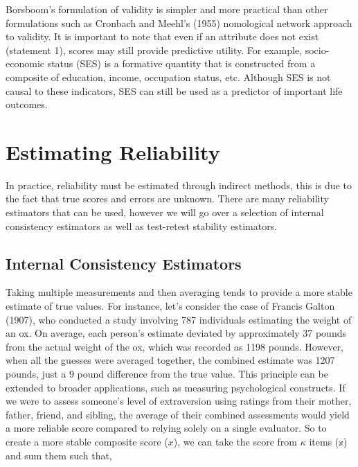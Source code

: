 \documentclass[
  letterpaper,
  DIV=11,
  numbers=noendperiod]{scrreprt}
\begin{document}
Borsboom's formulation of validity is simpler and more practical than
other formulations such as Cronbach and Meehl's (1955) nomological
network approach to validity. It is important to note that even if an
attribute does not exist (statement 1), scores may still provide
predictive utility. For example, socio-economic status (SES) is a
formative quantity that is constructed from a composite of education,
income, occupation status, etc. Although SES is not causal to these
indicators, SES can still be used as a predictor of important life
outcomes.

\hypertarget{estimating-reliability}{%
\section{Estimating Reliability}\label{estimating-reliability}}

In practice, reliability must be estimated through indirect methods,
this is due to the fact that true scores and errors are unknown. There
are many reliability estimators that can be used, however we will go
over a selection of internal consistency estimators as well as
test-retest stability estimators.

\hypertarget{internal-consistency-estimators}{%
\subsection{Internal Consistency
Estimators}\label{internal-consistency-estimators}}

Taking multiple measurements and then averaging tends to provide a more
stable estimate of true values. For instance, let's consider the case of
Francis Galton (1907), who conducted a study involving 787 individuals
estimating the weight of an ox. On average, each person's estimate
deviated by approximately 37 pounds from the actual weight of the ox,
which was recorded as 1198 pounds. However, when all the guesses were
averaged together, the combined estimate was 1207 pounds, just a 9 pound
difference from the true value. This principle can be extended to
broader applications, such as measuring psychological constructs. If we
were to assess someone's level of extraversion using ratings from their
mother, father, friend, and sibling, the average of their combined
assessments would yield a more reliable score compared to relying solely
on a single evaluator. So to create a more stable composite score
(\(x\)), we can take the score from \(\kappa\) items (\(\mathbb{x}\))
and sum them such that,
\end{document}
